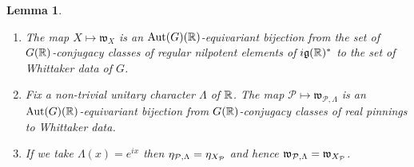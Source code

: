 \documentclass{article}
\newtheorem{lem}[thm]{Lemma}
\theoremstyle{definition}
\numberwithin{equation}{section}
\renewcommand{\-}{\hyp{}}
\newcommand{\g}{\mathfrak g}
\renewcommand{\P}{\mathcal P}
\newcommand{\w}{\mathfrak w}
\begin{document}
\begin{lem} \label{lem:w1}
\begin{enumerate}
\item The map $X \mapsto \w_X$ is an $\textrm{Aut}(G)(\mathbb{R})$-equivariant bijection from the set of $G(\mathbb{R})$-conjugacy classes of regular nilpotent elements of $i\g(\R)^*$ to the set of Whittaker data of $G$.
\item Fix a non-trivial unitary character $\Lambda$ of $\mathbb{R}$. The map $\P\mapsto \w_{\P,\Lambda}$ is an $\textrm{Aut}(G)(\mathbb{R})$-equivariant bijection from $G(\mathbb{R})$-conjugacy classes of real pinnings to Whittaker data.
\item If we take $\Lambda(x)=e^{ix}$ then $\eta_{\mathcal{P},\Lambda}=\eta_{X_{\mathcal{P}}}$ and hence $\mathfrak{w}_{\mathcal{P},\Lambda}=\mathfrak{w}_{X_{\mathcal{P}}}$.
\end{enumerate}
\end{lem}
\end{document}
